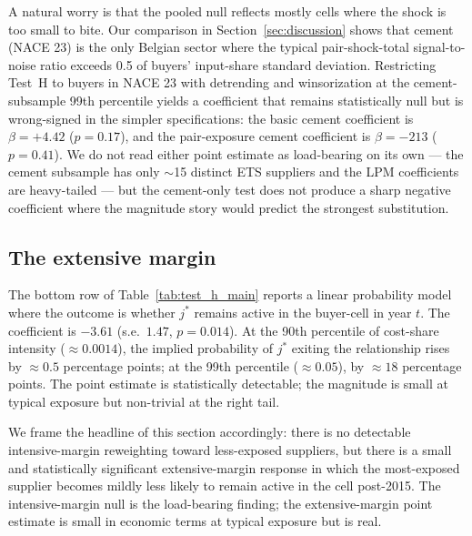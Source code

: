 A natural worry is that the pooled null reflects mostly cells where the shock is too small to bite. Our \citet{peter2023} comparison in Section~\ref{sec:discussion} shows that cement (NACE 23) is the only Belgian sector where the typical pair-shock-total signal-to-noise ratio exceeds 0.5 of buyers' input-share standard deviation. Restricting Test~H to buyers in NACE 23 with detrending and winsorization at the cement-subsample 99th percentile yields a coefficient that remains statistically null but is wrong-signed in the simpler specifications: the basic cement coefficient is $\beta = +4.42$ ($p = 0.17$), and the pair-exposure cement coefficient is $\beta = -213$ ($p = 0.41$). We do not read either point estimate as load-bearing on its own --- the cement subsample has only $\sim$15 distinct ETS suppliers and the LPM coefficients are heavy-tailed --- but the cement-only test does not produce a sharp negative coefficient where the magnitude story would predict the strongest substitution.

\subsection{The extensive margin}

The bottom row of Table~\ref{tab:test_h_main} reports a linear probability model where the outcome is whether $j^*$ remains active in the buyer-cell in year $t$. The coefficient is $-3.61$ (s.e.\ $1.47$, $p = 0.014$). At the 90th percentile of cost-share intensity ($\approx 0.0014$), the implied probability of $j^*$ exiting the relationship rises by $\approx 0.5$ percentage points; at the 99th percentile ($\approx 0.05$), by $\approx 18$ percentage points. The point estimate is statistically detectable; the magnitude is small at typical exposure but non-trivial at the right tail.

We frame the headline of this section accordingly: there is no detectable intensive-margin reweighting toward less-exposed suppliers, but there is a small and statistically significant extensive-margin response in which the most-exposed supplier becomes mildly less likely to remain active in the cell post-2015. The intensive-margin null is the load-bearing finding; the extensive-margin point estimate is small in economic terms at typical exposure but is real.
